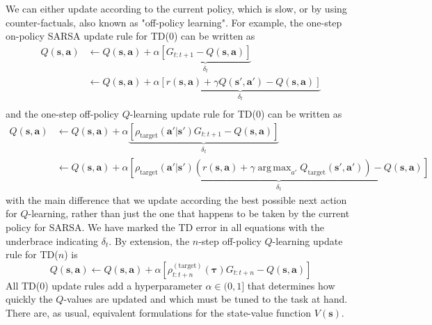 \documentclass{article}
\DeclareMathOperator*{\argmax}{arg\,max}
\begin{document}
We can either update according to the current policy, which is slow, or by using counter-factuals, also known as "off-policy learning". For example, the one-step on-policy SARSA update rule for TD(0) can be written as
\begin{equation}
\label{eq:SARSA_update}
\begin{split}
Q(\mathbf{s},\mathbf{a})&\leftarrow Q(\mathbf{s},\mathbf{a})+\alpha\underbrace{\left[G_{t:t+1}-Q(\mathbf{s},\mathbf{a})\right]}_\text{$\delta_t$}\\
&\leftarrow Q(\mathbf{s},\mathbf{a})+\alpha\underbrace{\left[r(\mathbf{s},\mathbf{a})+\gamma Q(\mathbf{s}',\mathbf{a}')-Q(\mathbf{s},\mathbf{a})\right]}_\text{$\delta_t$}\\
\end{split}
\end{equation}and the one-step off-policy $Q$-learning update rule for TD(0) can be written as
\begin{equation}\begin{split}\label{eq:q_learning_update}
Q(\mathbf{s},\mathbf{a})&\leftarrow Q(\mathbf{s},\mathbf{a})+\alpha\underbrace{\left[\rho_\text{target}(\mathbf{a}'|\mathbf{s}')G_{t:t+1}-Q(\mathbf{s},\mathbf{a})\right]}_\text{$\delta_t$}\\&\leftarrow Q(\mathbf{s},\mathbf{a})+\alpha\underbrace{\left[\rho_\text{target}(\mathbf{a}'|\mathbf{s}')\left(r(\mathbf{s},\mathbf{a})+\gamma \argmax_{a'}Q_\text{target}(\mathbf{s}',\mathbf{a}')\right)-Q(\mathbf{s},\mathbf{a})\right]}_\text{$\delta_t$}
\end{split}\end{equation}with the main difference that we update according the best possible next action for $Q$-learning, rather than just the one that happens to be taken by the current policy for SARSA. We have marked the TD error in all equations with the underbrace indicating $\delta_t$. By extension, the $n$-step off-policy $Q$-learning update rule for TD($n$) is
\begin{equation}\label{eq:n_step_q_learning_update}
Q(\mathbf{s},\mathbf{a})\leftarrow Q(\mathbf{s},\mathbf{a})+\alpha\left[\rho^{(\text{target})}_{ t:t+n}(\boldsymbol{\tau})G_{t:t+n}-Q(\mathbf{s},\mathbf{a})\right]\end{equation}All TD(0) update rules add a hyperparameter $\alpha\in(0,1]$ that determines how quickly the $Q$-values are updated and which must be tuned to the task at hand. There are, as usual, equivalent formulations for the state-value function $V(\mathbf{s})$.
\end{document}
